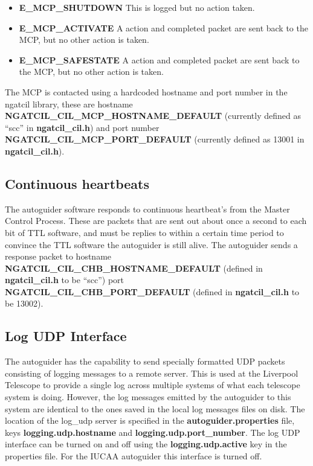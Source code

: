 \documentclass[10pt,a4paper]{article}
\begin{document}
\begin{itemize}
\item {\bf E\_MCP\_SHUTDOWN} This is logged but no action taken.
\item {\bf E\_MCP\_ACTIVATE} A action and completed packet are sent back to the MCP, but no other action is taken.
\item {\bf E\_MCP\_SAFESTATE} A action and completed packet are sent back to the MCP, but no other action is taken.
\end{itemize}

The MCP is contacted using a hardcoded hostname and port number in the ngatcil library, these are hostname {\bf NGATCIL\_CIL\_MCP\_HOSTNAME\_DEFAULT} (currently defined as ``scc'' in {\bf ngatcil\_cil.h}) and port number {\bf NGATCIL\_CIL\_MCP\_PORT\_DEFAULT}  (currently defined as 13001 in {\bf ngatcil\_cil.h}).

\subsection{Continuous heartbeats}

The autoguider software responds to continuous heartbeat's from the Master Control Process. These are packets that are sent out about once a second to each bit of TTL software, and must be replies to within a certain time period to convince the TTL software the autoguider is still alive. The autoguider sends a response packet to hostname {\bf NGATCIL\_CIL\_CHB\_HOSTNAME\_DEFAULT} (defined in {\bf ngatcil\_cil.h} to be ``scc'') port {\bf NGATCIL\_CIL\_CHB\_PORT\_DEFAULT} (defined in {\bf ngatcil\_cil.h} to be 13002).

\subsection{Log UDP Interface}

The autoguider has the capability to send specially formatted UDP packets consisting of logging messages to a remote server. This is used at the Liverpool Telescope to provide a single log across multiple systems of what each telescope system is doing. However, the log messages emitted by the autoguider to this system are identical to the ones saved in the local log messages files on disk. The location of the log\_udp server is specified in the {\bf autoguider.properties} file, keys {\bf logging.udp.hostname} and {\bf logging.udp.port\_number}. The log UDP interface can be turned on and off using the {\bf logging.udp.active} key in the properties file. For the IUCAA autoguider this interface is turned off.
\end{document}
